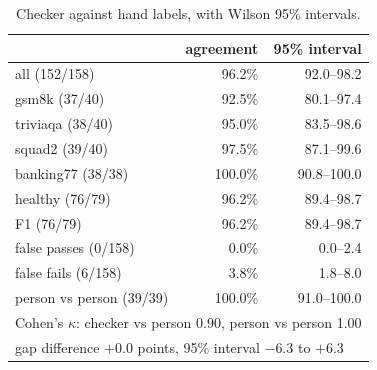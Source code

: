 \documentclass[11pt]{article}
\begin{document}
\begin{table}[h]
  \centering\small
  \caption{Checker against hand labels, with Wilson 95\% intervals.}
  \label{tab:hand}
  \begin{tabular}{lrr}
    \toprule
    & agreement & 95\% interval \\
    \midrule
    all (152/158) & 96.2\% & 92.0--98.2 \\
    \textsf{gsm8k} (37/40) & 92.5\% & 80.1--97.4 \\
    \textsf{triviaqa} (38/40) & 95.0\% & 83.5--98.6 \\
    \textsf{squad2} (39/40) & 97.5\% & 87.1--99.6 \\
    \textsf{banking77} (38/38) & 100.0\% & 90.8--100.0 \\
    healthy (76/79) & 96.2\% & 89.4--98.7 \\
    F1 (76/79) & 96.2\% & 89.4--98.7 \\
    \midrule
    false passes (0/158) & 0.0\% & 0.0--2.4 \\
    false fails (6/158) & 3.8\% & 1.8--8.0 \\
    person vs person (39/39) & 100.0\% & 91.0--100.0 \\
    \midrule
    \multicolumn{3}{l}{Cohen's $\kappa$: checker vs person 0.90, person vs person 1.00} \\
    \multicolumn{3}{l}{gap difference $+0.0$ points, 95\% interval $-6.3$ to $+6.3$} \\
    \bottomrule
  \end{tabular}
\end{table}
\end{document}
